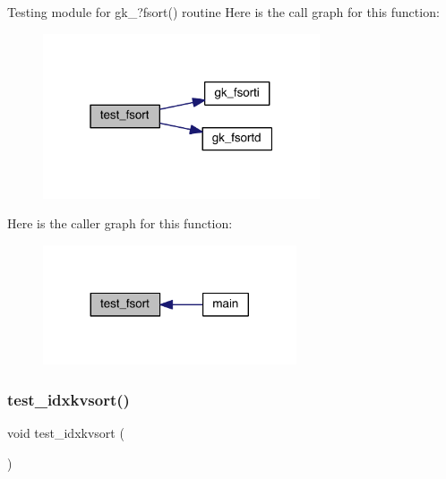 Testing module for gk\+\_\+?fsort() routine Here is the call graph for this function\+:\nopagebreak
\begin{figure}[H]
\begin{center}
\leavevmode
\includegraphics[width=232pt]{a00152_a92bfe9a7c6bec5eab568c71eda7eb1f1_cgraph}
\end{center}
\end{figure}
Here is the caller graph for this function\+:\nopagebreak
\begin{figure}[H]
\begin{center}
\leavevmode
\includegraphics[width=212pt]{a00152_a92bfe9a7c6bec5eab568c71eda7eb1f1_icgraph}
\end{center}
\end{figure}
\mbox{\label{a00152_ab63d10c508d01adca7672ac341b950ba}} 
\subsubsection{\texorpdfstring{test\+\_\+idxkvsort()}{test\_idxkvsort()}}
{\footnotesize\ttfamily void test\+\_\+idxkvsort (\begin{DoxyParamCaption}{ }\end{DoxyParamCaption})}

